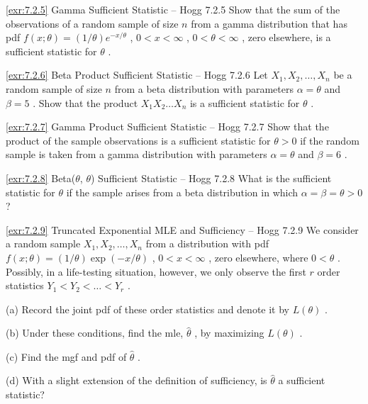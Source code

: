 \begin{exercise}{\ref{exr:7.2.5} Gamma Sufficient Statistic – Hogg 7.2.5}\label{exr:7.2.5}
Show that the sum of the observations of a random sample of size $n$ from a gamma distribution that has pdf $f(x; \theta) = (1 / \theta)e^{-x / \theta}$ , $0 < x < \infty$ , $0 < \theta < \infty$ , zero elsewhere, is a sufficient statistic for $\theta$ .
\end{exercise}

\begin{exercise}{\ref{exr:7.2.6} Beta Product Sufficient Statistic – Hogg 7.2.6}\label{exr:7.2.6}
Let $X_{1}, X_{2}, \ldots, X_{n}$ be a random sample of size $n$ from a beta distribution with parameters $\alpha = \theta$ and $\beta = 5$ . Show that the product $X_{1}X_{2}\dots X_{n}$ is a sufficient statistic for $\theta$ .
\end{exercise}

\begin{exercise}{\ref{exr:7.2.7} Gamma Product Sufficient Statistic – Hogg 7.2.7}\label{exr:7.2.7}
Show that the product of the sample observations is a sufficient statistic for $\theta > 0$ if the random sample is taken from a gamma distribution with parameters $\alpha = \theta$ and $\beta = 6$ .
\end{exercise}

\begin{exercise}{\ref{exr:7.2.8} Beta($\theta$, $\theta$) Sufficient Statistic – Hogg 7.2.8}\label{exr:7.2.8}
What is the sufficient statistic for $\theta$ if the sample arises from a beta distribution in which $\alpha = \beta = \theta > 0$ ?
\end{exercise}

\begin{exercise}{\ref{exr:7.2.9} Truncated Exponential MLE and Sufficiency – Hogg 7.2.9}\label{exr:7.2.9}
We consider a random sample $X_{1}, X_{2}, \ldots, X_{n}$ from a distribution with pdf $f(x; \theta) = (1 / \theta) \exp(-x / \theta)$ , $0 < x < \infty$ , zero elsewhere, where $0 < \theta$ . Possibly, in a life-testing situation, however, we only observe the first $r$ order statistics $Y_{1} < Y_{2} < \dots < Y_{r}$ .

(a) Record the joint pdf of these order statistics and denote it by $L(\theta)$ .

(b) Under these conditions, find the mle, $\hat{\theta}$ , by maximizing $L(\theta)$ .

(c) Find the mgf and pdf of $\hat{\theta}$ .

(d) With a slight extension of the definition of sufficiency, is $\hat{\theta}$ a sufficient statistic?
\end{exercise}

